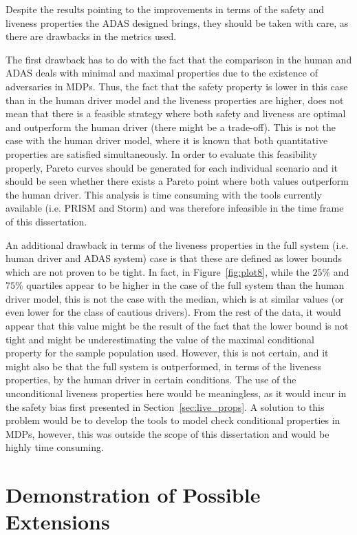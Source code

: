 Despite the results pointing to the improvements in terms of the safety and liveness properties the ADAS designed brings, they should be taken with care, as there are drawbacks in the metrics used. 

The first drawback has to do with the fact that the comparison in the human and ADAS deals with minimal and maximal properties due to the existence of adversaries in MDPs. Thus, the fact that the safety property is lower in this case than in the human driver model and the liveness properties are higher, does not mean that there is a feasible strategy where both safety and liveness are optimal and outperform the human driver (there might be a trade-off). This is not the case with the human driver model, where it is known that both quantitative properties are satisfied simultaneously. In order to evaluate this feasibility properly, Pareto curves should be generated for each individual scenario and it should be seen whether there exists a Pareto point where both values outperform the human driver. This analysis is time consuming with the tools currently available (i.e. PRISM and Storm) and was therefore infeasible in the time frame of this dissertation. 

An additional drawback in terms of the liveness properties in the full system (i.e. human driver and ADAS system) case is that these are defined as lower bounds which are not proven to be tight. In fact, in Figure~\ref{fig:plot8}, while the $25\%$ and $75\%$ quartiles appear to be higher in the case of the full system than the human driver model, this is not the case with the median, which is at similar values (or even lower for the class of cautious drivers). From the rest of the data, it would appear that this value might be the result of the fact that the lower bound is not tight and might be underestimating the value of the maximal conditional property for the sample population used. However, this is not certain, and it might also be that the full system is outperformed, in terms of the liveness properties, by the human driver in certain conditions. The use of the unconditional liveness properties here would be meaningless, as it would incur in the safety bias first presented in Section~\ref{sec:live_props}. A solution to this problem would be to develop the tools to model check conditional properties in MDPs, however, this was outside the scope of this dissertation and would be highly time consuming.

\section{Demonstration of Possible Extensions}
\label{sec:add_exp}

